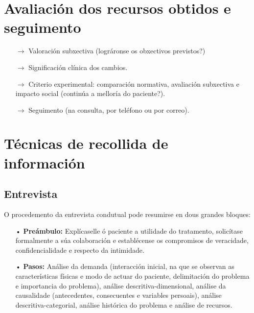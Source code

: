 \documentclass[a4paper,11pt]{article}
\begin{document}
\section{Avaliación dos recursos obtidos e seguimento}
\begin{itemize}
	\item[$\rightarrow$] Valoración subxectiva (lográronse os obxectivos previstos?)
	\item[$\rightarrow$] Significación clínica dos cambios.
	\item[$\rightarrow$] Criterio experimental: comparación normativa, avaliación subxectiva e 
	impacto social (continúa a melloría do paciente?).
	\item[$\rightarrow$] Seguimento (na consulta, por teléfono ou por correo). 
\end{itemize}

\section{Técnicas de recollida de información}
\subsection{Entrevista}
O procedemento da entrevista condutual pode resumirse en dous grandes bloques:
\begin{itemize}
	\item[•] \textbf{Preámbulo:} Explícaselle ó paciente a utilidade do tratamento, solicítase 
	formalmente a súa colaboración e establécense os compromisos de veracidade, confidencialidade e 
	respecto da intimidade. 
	\item[•] \textbf{Pasos:} Análise da demanda (interacción inicial, na que se observan as 
	características físicas e modo de actuar do paciente, delimitación do problema e importancia do 
	problema), análise descritiva-dimensional, análise da causalidade (antecedentes, consecuentes e 
	variables persoais), análise descritiva-categorial, análise histórica do problema e análise de 
	recursos.
\end{itemize}
\end{document}
